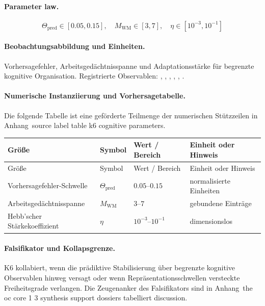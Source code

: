 \paragraph{Parameter law.}
\[
\Theta_{\mathrm{pred}} \in [0.05,0.15],\quad M_{\mathrm{WM}} \in [3,7],\quad \eta \in [10^{-3},10^{-1}]
\]

\paragraph{Beobachtungsabbildung und Einheiten.}
Vorhersagefehler, Arbeitsgedächtnisspanne und Adaptationsstärke für begrenzte kognitive Organisation.
Registrierte Observablen: , \allowbreak {}, \allowbreak {}, \allowbreak {}, \allowbreak {}, \allowbreak {}.

\paragraph{Numerische Instanziierung und Vorhersagetabelle.}
Die folgende Tabelle ist eine geförderte Teilmenge der numerischen Stützzeilen in Anhang~source label table k6 cognitive parameters.
\begin{longtable}{@{}L{0.27\textwidth}L{0.15\textwidth}L{0.24\textwidth}L{0.16\textwidth}@{}}
\toprule
Größe & Symbol & Wert / Bereich & Einheit oder Hinweis \\
\midrule
\endfirsthead
\toprule
Größe & Symbol & Wert / Bereich & Einheit oder Hinweis \\
\midrule
\endhead
Vorhersagefehler-Schwelle & $\scriptstyle \Theta_{\mathrm{pred}}$ & $0.05\text{--}0.15$ & normalisierte Einheiten \\
Arbeitsgedächtnisspanne & $\scriptstyle M_{\mathrm{WM}}$ & $3\text{--}7$ & gebundene Einträge \\
Hebb'scher Stärkekoeffizient & $\scriptstyle \eta$ & $10^{-3}\text{--}10^{-1}$ & dimensionslos \\
\bottomrule
\end{longtable}

\paragraph{Falsifikator und Kollapsgrenze.}
K6 kollabiert, wenn die prädiktive Stabilisierung über begrenzte kognitive Observablen hinweg versagt oder wenn Repräsentationsschwellen versteckte Freiheitsgrade verlangen.
Die Zeugenanker des Falsifikators sind in Anhang~the oc core 1 3 synthesis support dossiers tabelliert discussion.

